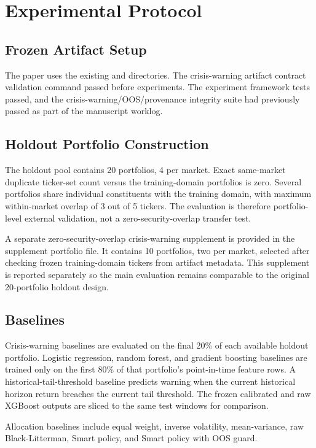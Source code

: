 \documentclass{ieeeaccess}
\begin{document}
\section{Experimental Protocol}
\label{sec:protocol}

\subsection{Frozen Artifact Setup}
The paper uses the existing  and  directories. The crisis-warning artifact contract validation command passed before experiments. The experiment framework tests passed, and the crisis-warning/OOS/provenance integrity suite had previously passed as part of the manuscript worklog.

\subsection{Holdout Portfolio Construction}
The holdout pool contains 20 portfolios, 4 per market. Exact same-market duplicate ticker-set count versus the training-domain portfolios is zero. Several portfolios share individual constituents with the training domain, with maximum within-market overlap of 3 out of 5 tickers. The evaluation is therefore portfolio-level external validation, not a zero-security-overlap transfer test.

A separate zero-security-overlap crisis-warning supplement is provided in the supplement portfolio file. It contains 10 portfolios, two per market, selected after checking frozen training-domain tickers from artifact metadata. This supplement is reported separately so the main evaluation remains comparable to the original 20-portfolio holdout design.

\subsection{Baselines}
Crisis-warning baselines are evaluated on the final 20\% of each available holdout portfolio. Logistic regression, random forest, and gradient boosting baselines are trained only on the first 80\% of that portfolio's point-in-time feature rows. A historical-tail-threshold baseline predicts warning when the current historical horizon return breaches the current tail threshold. The frozen calibrated and raw XGBoost outputs are sliced to the same test windows for comparison.

Allocation baselines include equal weight, inverse volatility, mean-variance, raw Black-Litterman, Smart policy, and Smart policy with OOS guard.
\end{document}
